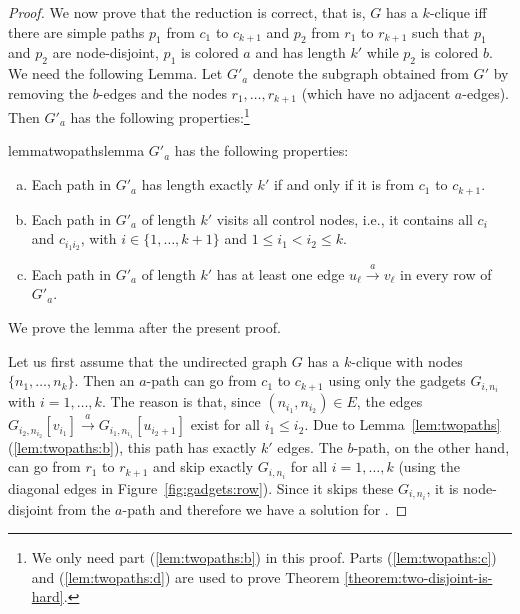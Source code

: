 \documentclass[a4paper,english]{lipics-v2016}
\theoremstyle{plain}
\begin{document}
\TheoTwoColor*
\begin{proof}

   We now prove that the reduction is correct, that is, $G$ has a
   $k$-clique iff there are simple paths $p_1$ from
   $c_1$ to $c_{k+1}$ and $p_2$ from $r_1$ to $r_{k+1}$ such that $p_1$ and $p_2$ are node-disjoint, $p_1$ is colored $a$ and has length $k'$ while $p_2$ is colored $b$. We need
   the following Lemma. Let $G'_a$ denote the subgraph obtained from $G'$ 
  by removing the $b$-edges and the nodes $r_1,\ldots,r_{k+1}$ (which
  have no adjacent $a$-edges).
  Then $G'_a$ has the following properties:\footnote{We only need part
    (\ref{lem:twopaths:b}) in this proof. Parts (\ref{lem:twopaths:c})
    and (\ref{lem:twopaths:d}) are used to prove Theorem \ref{theorem:two-disjoint-is-hard}.}
   \begin{restatable}{lemma}{twopathslemma} \label{lem:twopaths}
     $G'_a$ has the following properties:
     \begin{enumerate}[(a)]
                    \item Each path in $G'_a$ has length exactly $k'$ if and only if it
       is from $c_1$ to $c_{k+1}$. \label{lem:twopaths:b}
       
     \item Each path in $G'_a$ of length $k'$ visits all control
       nodes, i.e., it contains all $c_{i}$ and $c_{i_1i_2}$, with $i \in
       \{1,\ldots, k+1\}$ and $1\leq i_1<i_2 \leq k$. \label{lem:twopaths:c}
     \item Each path in $G'_a$ of length $k'$ has at least one edge
       $u_\ell \stackrel{a}{\to} v_\ell$ in  every row of $G'_a$. \label{lem:twopaths:d}
     \end{enumerate}
   \end{restatable}
   We prove the lemma after the present proof.
  
   
   Let us first assume that the undirected graph $G$ has a $k$-clique
   with nodes $\{n_1, \ldots, n_k\}$. Then an $a$-path can go
   from $c_1$ to $c_{k+1}$ using only the gadgets $G_{i,n_i}$ with $i = 1,
   \ldots, k$. The reason is that, since $(n_{i_1},n_{i_2}) \in E$,
   the edges $G_{i_2,n_{i_2}}[v_{i_1}] \stackrel{a}{\to}
   G_{i_1,n_{i_1}}[u_{i_2+1}]$ exist for all $i_1 \leq i_2$. Due to
   Lemma~\ref{lem:twopaths}(\ref{lem:twopaths:b}), this path has exactly $k'$ edges.
   The $b$-path, on the other hand, can go from $r_1$ to $r_{k+1}$
   and skip exactly $G_{i,n_i}$ for all $i = 1, \ldots, k$ (using the
   diagonal edges in Figure~\ref{fig:gadgets:row}). Since it
   skips these $G_{i,n_i}$, it is node-disjoint from the $a$-path and therefore we have a solution for
   \kcolordisjointpaths. 
  

\end{proof}
\end{document}
